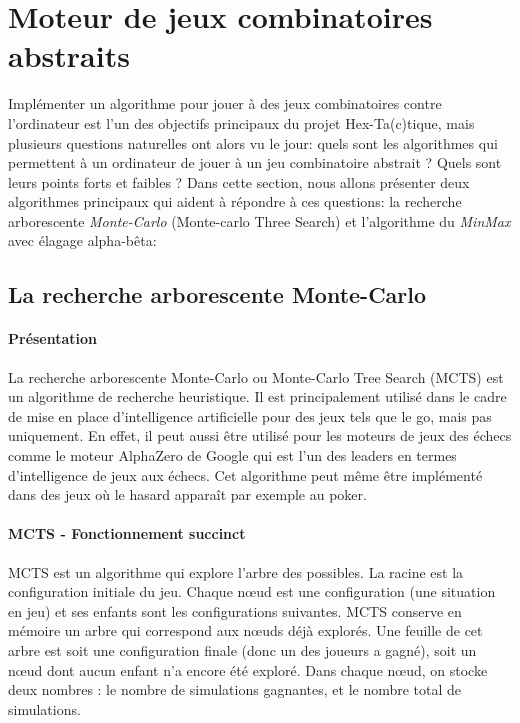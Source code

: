 \section{Moteur de jeux combinatoires abstraits}





Implémenter un algorithme pour jouer à des jeux combinatoires contre l'ordinateur est l'un des objectifs principaux du projet
Hex-Ta(c)tique, mais plusieurs questions naturelles ont alors vu le jour: quels sont les algorithmes qui permettent à un ordinateur
de jouer à un jeu combinatoire abstrait ? Quels sont leurs points forts et faibles ? Dans cette section, nous allons
présenter deux algorithmes principaux qui aident à répondre à ces questions: la recherche arborescente \emph{Monte-Carlo} (Monte-carlo Three Search) 
et l'algorithme du \emph{MinMax} avec élagage alpha-bêta:

\subsection{La recherche arborescente Monte-Carlo}

\paragraph{Présentation}
La recherche arborescente Monte-Carlo ou Monte-Carlo Tree Search (MCTS) est un algorithme de recherche heuristique.
Il est principalement utilisé dans le cadre de mise en place d'intelligence artificielle pour des jeux tels que le go, mais pas uniquement.
En effet, il peut aussi être utilisé pour les moteurs de jeux des échecs comme le moteur AlphaZero de Google qui est
l'un des leaders en termes d'intelligence de jeux aux échecs. Cet algorithme peut même être implémenté dans des jeux où le hasard 
apparaît par exemple au poker.

\paragraph{MCTS - Fonctionnement succinct}
MCTS est un algorithme qui explore l'arbre des possibles. La racine est la configuration initiale du jeu.
Chaque nœud est une configuration (une situation en jeu) et ses enfants sont les configurations suivantes. MCTS conserve en mémoire 
un arbre qui correspond aux nœuds déjà explorés. Une feuille de cet arbre est soit une configuration finale (donc un des joueurs a gagné),
soit un nœud dont aucun enfant n'a encore été exploré. Dans chaque nœud, on stocke deux nombres : le nombre de simulations gagnantes, 
et le nombre total de simulations. 


